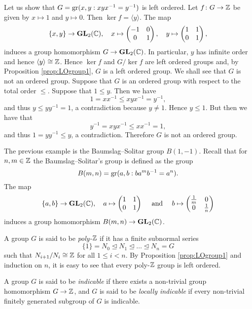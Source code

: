 \begin{example}
	Let us show that $G=\operatorname{gr}( x,y:xyx^{-1}=y^{-1})$ is left ordered. Let 
	$f\colon G\to\mathbb{Z}$ be given by $x\mapsto 1$ and $y\mapsto 0$. Then $\ker f=\langle y\rangle$. 
	 The map
\[
\{ x,y\}\to\mathbf{GL}_2(\mathbb{C}),
\quad 
x\mapsto\begin{pmatrix}
-1&0\\
0&1	
\end{pmatrix},
\quad
y\mapsto\begin{pmatrix}
1&1\\
0&1	
\end{pmatrix},
\]
induces a group homomorphism $G\to \mathbf{GL}_2(\mathbb{C})$. 
In particular, $y$ has infinite order and hence $\langle y\rangle\cong\mathbb{Z}$. Hence $\ker f$ and $G/\ker f$ are left ordered groups and, by Proposition \ref{prop:LOgroup1}, $G$ is a left ordered group. We shall see that $G$ is not an ordered group. Suppose that $G$ is an ordered group with respect to the total order $\leq$. Suppose that $1\leq y$. Then we have
\[ 1=xx^{-1}\leq xyx^{-1}=y^{-1},\]
and thus $y\leq yy^{-1}=1$, a contradiction because $y\neq 1$. Hence $y\leq 1$. But then we have that
\[ y^{-1}=xyx^{-1}\leq xx^{-1}=1,\]
and thus $1=yy^{-1}\leq  y$, a contradiction. Therefore $G$ is not an ordered group.
\end{example}

The previous example is the Baumslag--Solitar group $B(1,-1)$. Recall that for $n,m\in\mathbb{Z}$
the Baumslag--Solitar's group is defined as the 
group \[
B(m,n)=\operatorname{gr}(a,b:ba^mb^{-1}=a^n).
\]
The map 
\[
\{ a,b\}\to\mathbf{GL}_2(\mathbb{C}),\quad
a\mapsto\begin{pmatrix}
1&1\\
0&1	
\end{pmatrix}\quad\text{ and }\quad  
b\mapsto\begin{pmatrix}
\frac{1}{m}&0\\
0&\frac{1}{n}	
\end{pmatrix}
\] 
induces a group homomorphism $B(m,n)\to \mathbf{GL}_2(\mathbb{C})$.



A group $G$ is said to be {\em poly-$\mathbb{Z}$} if it has a finite subnormal series
\[ \{ 1\}=N_0\unlhd N_1\unlhd\dots\unlhd N_n=G\]
such that $N_{i+1}/N_{i}\cong \mathbb{Z}$ for all $1\leq i<n$.
By Proposition \ref{prop:LOgroup1} and induction on $n$, it is easy to see that every poly-$\mathbb{Z}$ group is left ordered. 

A group $G$ is said to be {\em indicable} if there exists a non-trivial 
group homomorphism $G\to\mathbb{Z}$, and $G$ is said to be {\em locally indicable} 
if every non-trivial finitely generated subgroup of $G$ is indicable.  

